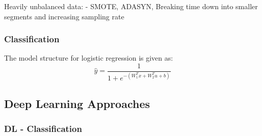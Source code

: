 %
% 

Heavily unbalanced data:
- SMOTE, ADASYN, Breaking time down into smaller segments and increasing sampling rate

\subsubsection{Classification}
The model structure for logistic regression is given as:
\begin{equation}
    \hat{y} = \frac{1}{1 + e^{-(W_1^Tx + W_2^Tu + b)}}
    \label{eq:02LogS}
\end{equation}

\subsection{Deep Learning Approaches}
\subsubsection{DL - Classification}
